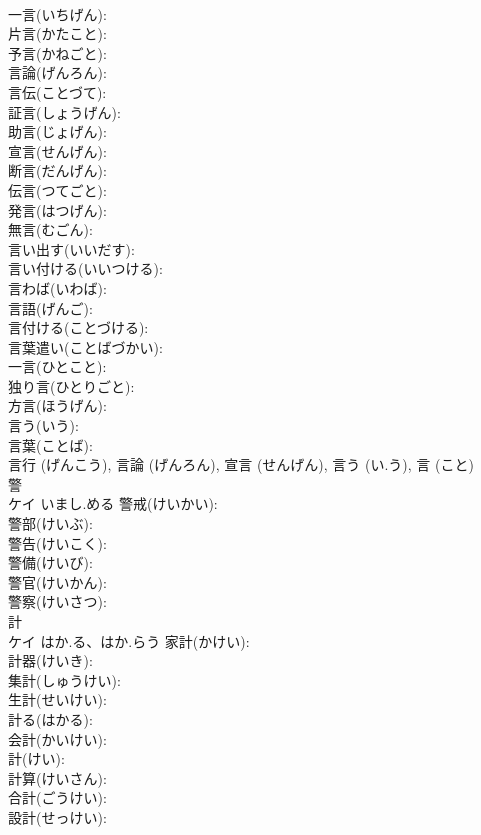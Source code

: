 \documentclass[8pt]{extreport}
\begin{document}
\begin{CJK}{UTF8}{min}
\\	一言(いちげん): 
\\	片言(かたこと): 
\\	予言(かねごと): 
\\	言論(げんろん): 
\\	言伝(ことづて): 
\\	証言(しょうげん): 
\\	助言(じょげん): 
\\	宣言(せんげん): 
\\	断言(だんげん): 
\\	伝言(つてごと): 
\\	発言(はつげん): 
\\	無言(むごん): 
\\	言い出す(いいだす): 
\\	言い付ける(いいつける): 
\\	言わば(いわば): 
\\	言語(げんご): 
\\	言付ける(ことづける): 
\\	言葉遣い(ことばづかい): 
\\	一言(ひとこと): 
\\	独り言(ひとりごと): 
\\	方言(ほうげん): 
\\	言う(いう): 
\\	言葉(ことば): 
\\	言行 (げんこう), 言論 (げんろん), 宣言 (せんげん), 言う (い.う), 言 (こと)
\\	警			
\\	ケイ	いまし.める	警戒(けいかい): 
\\	警部(けいぶ): 
\\	警告(けいこく): 
\\	警備(けいび): 
\\	警官(けいかん): 
\\	警察(けいさつ): 
\\	計			
\\	ケイ	はか.る、はか.らう	家計(かけい): 
\\	計器(けいき): 
\\	集計(しゅうけい): 
\\	生計(せいけい): 
\\	計る(はかる): 
\\	会計(かいけい): 
\\	計(けい): 
\\	計算(けいさん): 
\\	合計(ごうけい): 
\\	設計(せっけい): 

\end{CJK}
\end{document}
